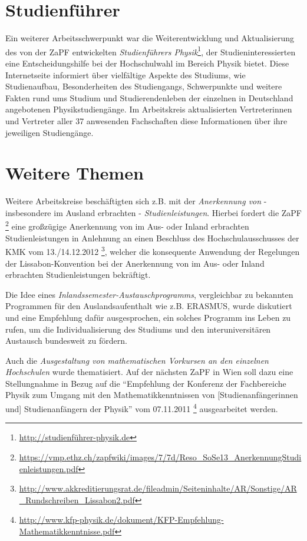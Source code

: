\documentclass{scrartcl}
\begin{document}
\section*{Studienführer}
Ein weiterer Arbeitsschwerpunkt war die Weiterentwicklung und Aktualisierung des von der ZaPF entwickelten \emph{Studienführers Physik}\footnote{\href{http://studienführer-physik.de}{\url{http://studienführer-physik.de}}}, der Studieninteressierten eine Entscheidungshilfe bei der Hochschulwahl im Bereich Physik bietet. Diese Internetseite informiert über vielfältige Aspekte des Studiums, wie Studienaufbau, Besonderheiten des Studiengangs, Schwerpunkte und weitere Fakten rund ums Studium und Studierendenleben der einzelnen in Deutschland angebotenen Physikstudiengänge. Im Arbeitskreis aktualisierten Vertreterinnen und Vertreter aller 37 anwesenden Fachschaften diese Informationen über ihre jeweiligen Studiengänge.

\section*{Weitere Themen}
Weitere Arbeitskreise beschäftigten sich z.B. mit der \emph{Anerkennung von} - insbesondere im Ausland erbrachten - \emph{Studienleistungen}. Hierbei fordert die ZaPF \footnote{\href{https://vmp.ethz.ch/zapfwiki/images/7/7d/Reso_SoSe13_AnerkennungStudienleistungen.pdf}{\url{https://vmp.ethz.ch/zapfwiki/images/7/7d/Reso_SoSe13_AnerkennungStudienleistungen.pdf}}} eine großzügige Anerkennung von im Aus- oder Inland erbrachten Studienleistungen in Anlehnung an einen Beschluss des Hochschulausschusses der KMK vom 13./14.12.2012 \footnote{\href{http://www.akkreditierungsrat.de/fileadmin/Seiteninhalte/AR/Sonstige/AR_Rundschreiben_Lissabon2.pdf}{\url{http://www.akkreditierungsrat.de/fileadmin/Seiteninhalte/AR/Sonstige/AR_Rundschreiben_Lissabon2.pdf}}}, welcher die konsequente Anwendung der Regelungen der Lissabon-Konvention bei der Anerkennung von im Aus- oder Inland erbrachten Studienleistungen bekräftigt.

Die Idee eines \emph{Inlandssemester-Austauschprogramms}, vergleichbar zu bekannten Programmen für den Auslandsaufenthalt wie z.B. ERASMUS, wurde diskutiert und eine Empfehlung dafür ausgesprochen, ein solches Programm ins Leben zu rufen, um die Individualisierung des Studiums und den interuniversitären Austausch bundesweit zu fördern.

Auch die \emph{Ausgestaltung von mathematischen Vorkursen an den einzelnen Hochschulen} wurde thematisiert. Auf der nächsten ZaPF in Wien soll dazu eine Stellungnahme in Bezug auf die "`Empfehlung der Konferenz der Fachbereiche Physik zum Umgang mit den Mathematikkenntnissen von [Studienanfängerinnen und] Studienanfängern der Physik"' vom 07.11.2011 \footnote{\href{http://www.kfp-physik.de/dokument/KFP-Empfehlung-Mathematikkenntnisse.pdf}{\url{http://www.kfp-physik.de/dokument/KFP-Empfehlung-Mathematikkenntnisse.pdf}}} ausgearbeitet werden.
\end{document}
